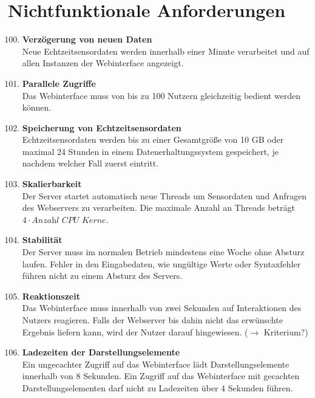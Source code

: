 \chapter{Nichtfunktionale Anforderungen}
\begin{enumerate}[label=\textbf{NF\arabic{enumi}0}]
	\setcounter{enumi}{99}
	
	\item \textbf{Verzögerung von neuen Daten}\\
	Neue Echtzeitsensordaten werden innerhalb einer Minute verarbeitet und auf allen Instanzen der Webinterface angezeigt.
	
	\item \textbf{Parallele Zugriffe}\\
	Das Webinterface muss von bis zu 100 Nutzern gleichzeitig bedient werden können.
	
	\item \textbf{Speicherung von Echtzeitsensordaten}\\
	Echtzeitsensordaten werden bis zu einer Gesamtgröße von 10 GB oder maximal 24 Stunden in einem Datenerhaltungssystem gespeichert, je nachdem welcher Fall zuerst eintritt.
	
	\item \textbf{Skalierbarkeit}\\
	Der Server startet automatisch neue Threads um Sensordaten und Anfragen des Webservers zu verarbeiten. Die maximale Anzahl an Threads beträgt $4 \cdot \textit{Anzahl CPU Kerne}$.
	
	\item \textbf{Stabilität}\\  
	Der Server muss im normalen Betrieb mindestens eine Woche ohne Absturz laufen. Fehler in den Eingabedaten, wie ungültige Werte oder Syntaxfehler führen nicht zu einem Absturz des Servers.
	
	\item \textbf{Reaktionszeit}\\
	Das Webinterface muss innerhalb von zwei Sekunden auf Interaktionen des Nutzers reagieren. Falls der Webserver bis dahin nicht das erwünschte Ergebnis liefern kann, wird der Nutzer darauf hingewiesen. ($\to$ Kriterium?)
	
	\item \textbf{Ladezeiten der Darstellungselemente}\\
	Ein ungecachter Zugriff auf das Webinterface lädt Darstellungselemente innerhalb von 8 Sekunden. Ein Zugriff auf das Webinterface mit gecachten Darstellungselementen darf nicht zu Ladezeiten über 4 Sekunden führen.
	

\end{enumerate}
